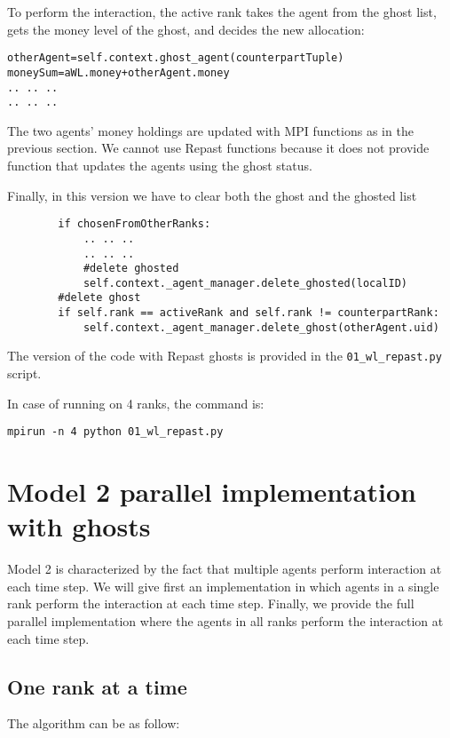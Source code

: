 \documentclass{article}
\begin{document}
To perform the interaction, the active rank takes the agent from the ghost list, gets the money level of the ghost, and decides the new allocation:
\begin{verbatim}
otherAgent=self.context.ghost_agent(counterpartTuple)     
moneySum=aWL.money+otherAgent.money
.. .. ..
.. .. ..
\end{verbatim}
The two agents' money holdings are updated with MPI functions as in the previous section. We cannot use Repast functions because it does not provide function that updates the agents using the ghost status.

Finally, in this version we have to clear both the ghost and the ghosted list
\begin{verbatim}
        if chosenFromOtherRanks:
            .. .. ..
            .. .. ..
            #delete ghosted
            self.context._agent_manager.delete_ghosted(localID)
        #delete ghost
        if self.rank == activeRank and self.rank != counterpartRank:
            self.context._agent_manager.delete_ghost(otherAgent.uid)
\end{verbatim}

The version of the code with Repast ghosts is provided in the \verb+01_wl_repast.py+ script.

In case of running on 4 ranks, the command is:
\begin{verbatim}
mpirun -n 4 python 01_wl_repast.py
\end{verbatim}



\section{Model 2 parallel implementation with ghosts}
Model 2 is characterized by the fact that multiple agents perform interaction at each time step.
We will give first an implementation in which agents in a single rank perform the interaction at each time step. Finally, we provide the full parallel implementation where the agents in all ranks perform the interaction at each time step.
\subsection{One rank at a time}
The algorithm can be as follow:
\end{document}
